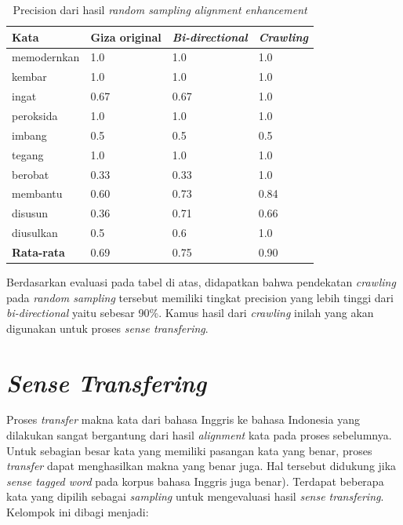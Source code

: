 \begin{table}
	\centering
	\caption{Precision dari hasil \textit{random sampling alignment enhancement}}
	\label{table:enhancement-precision}
	\begin{tabular}{|p{2.5cm}|p{3cm}|p{3cm}|p{3cm}|}
		\hline
		\textbf{Kata} & \textbf{Giza original} & \textbf{\textit{Bi-directional}} & \textbf{\textit{Crawling}}
		\\ \hline
		memodernkan & 1.0 & 1.0 & 1.0 \\ \hline
		kembar & 1.0 & 1.0 & 1.0 \\ \hline
		ingat & 0.67 & 0.67 & 1.0 \\ \hline
		peroksida & 1.0 & 1.0 & 1.0 \\ \hline
		imbang & 0.5 & 0.5 & 0.5 \\ \hline
		tegang & 1.0  & 1.0 & 1.0 \\ \hline
		berobat & 0.33  & 0.33 & 1.0 \\ \hline
		membantu & 0.60 & 0.73 & 0.84 \\ \hline
		disusun & 0.36  & 0.71 & 0.66 \\ \hline
		diusulkan & 0.5 & 0.6 & 1.0 \\ \hline	
		\hline
		\textbf{Rata-rata} & 0.69 & 0.75 & 0.90 \\ \hline
	\end{tabular}
\end{table}

Berdasarkan evaluasi pada tabel di atas, didapatkan bahwa pendekatan \textit{crawling} pada \textit{random sampling} tersebut memiliki tingkat precision yang lebih tinggi dari \textit{bi-directional} yaitu sebesar 90\%. Kamus hasil dari \textit{crawling} inilah yang akan digunakan untuk proses \textit{sense transfering}.

\section{\textit{Sense Transfering}}

Proses \textit{transfer} makna kata dari bahasa Inggris ke bahasa Indonesia yang dilakukan sangat bergantung dari hasil \textit{alignment} kata pada proses sebelumnya. Untuk sebagian besar kata yang memiliki pasangan kata yang benar, proses \textit{transfer} dapat menghasilkan makna yang benar juga. Hal tersebut didukung jika \textit{sense tagged word} pada korpus bahasa Inggris juga benar). Terdapat beberapa kata yang dipilih sebagai \textit{sampling} untuk mengevaluasi hasil \textit{sense transfering}. Kelompok ini dibagi menjadi:

